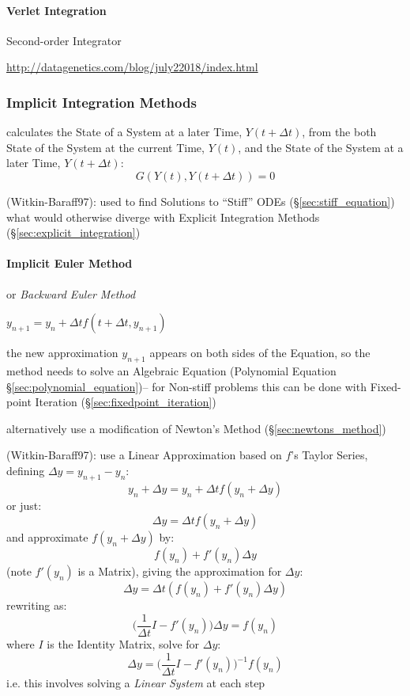 {\paragraph{Verlet Integration}\label{sec:verlet_integration}\hfill

Second-order Integrator

\url{http://datagenetics.com/blog/july22018/index.html}



\subsubsection{Implicit Integration Methods}\label{sec:implicit_integration}

calculates the State of a System at a later Time, $Y(t + \Delta{t})$, from the
both State of the System at the current Time, $Y(t)$, and the State of the
System at a later Time, $Y(t + \Delta{t})$:
\[
  G(Y(t), Y(t + \Delta{t})) = 0
\]

(Witkin-Baraff97): used to find Solutions to ``Stiff'' ODEs
(\S\ref{sec:stiff_equation}) what would otherwise diverge with Explicit
Integration Methods (\S\ref{sec:explicit_integration})



\paragraph{Implicit Euler Method}\label{sec:implicit_euler}\hfill

or \emph{Backward Euler Method}

$y_{n+1} = y_n + \Delta{t}f(t + \Delta{t}, y_{n+1})$

the new approximation $y_{n+1}$ appears on both sides of the Equation, so the
method needs to solve an Algebraic Equation (Polynomial Equation
\S\ref{sec:polynomial_equation})-- for Non-stiff problems this can be done with
Fixed-point Iteration (\S\ref{sec:fixedpoint_iteration})

alternatively use a modification of Newton's Method (\S\ref{sec:newtons_method})

(Witkin-Baraff97): use a Linear Approximation based on $f$'s Taylor Series,
defining $\Delta{y} = y_{n+1} - y_n$:
\[
  y_n + \Delta{y} = y_n + \Delta{t}f(y_n + \Delta{y})
\]
or just:
\[
  \Delta{y} = \Delta{t}f(y_n + \Delta{y})
\]
and approximate $f(y_n + \Delta{y})$ by:
\[
  f(y_n) + f'(y_n)\Delta{y}
\]
(note $f'(y_n)$ is a Matrix), giving the approximation for $\Delta{y}$:
\[
  \Delta{y} = \Delta{t}(f(y_n) + f'(y_n)\Delta{y})
\]
rewriting as:
\[
  \Big(\frac{1}{\Delta{t}}I - f'(y_n)\Big)\Delta{y} = f(y_n)
\]
where $I$ is the Identity Matrix, solve for $\Delta{y}$:
\[
  \Delta{y} = \Big(\frac{1}{\Delta{t}}I - f'(y_n)\Big)^{-1}f(y_n)
\]
i.e. this involves solving a \emph{Linear System} at each step



}
